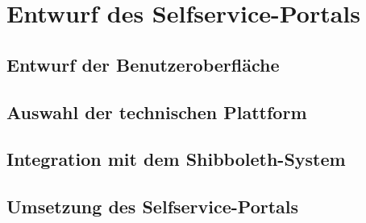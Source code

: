 \section{Entwurf des Selfservice-Portals}\label{sec:konzeption}
   \subsection{Entwurf der Benutzeroberfläche}\label{subsec:entwurf}
   \subsection{Auswahl der technischen Plattform}\label{subsec:auswahl}
   \subsection{Integration mit dem Shibboleth-System}\label{subsec:integration}
   \subsection{Umsetzung des Selfservice-Portals}\label{subsec:umsetzung}